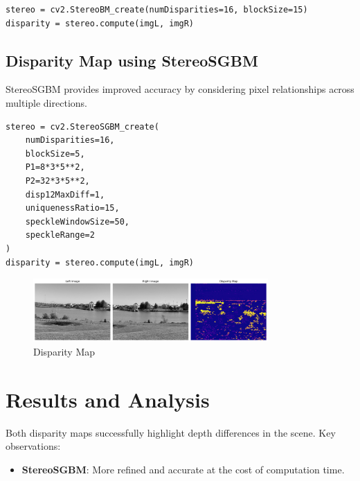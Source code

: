 \documentclass[12pt]{article}
\begin{document}
\begin{verbatim}
stereo = cv2.StereoBM_create(numDisparities=16, blockSize=15)
disparity = stereo.compute(imgL, imgR)
\end{verbatim}


\subsection{Disparity Map using StereoSGBM}
StereoSGBM provides improved accuracy by considering pixel relationships across multiple directions.

\begin{verbatim}
stereo = cv2.StereoSGBM_create(
    numDisparities=16,
    blockSize=5,
    P1=8*3*5**2,
    P2=32*3*5**2,
    disp12MaxDiff=1,
    uniquenessRatio=15,
    speckleWindowSize=50,
    speckleRange=2
)
disparity = stereo.compute(imgL, imgR)
\end{verbatim}

\begin{figure}[H]
    \centering
    \includegraphics[width=0.8\textwidth]{disparity_result2.png}
    \caption{Disparity Map}
\end{figure}

\section{Results and Analysis}
Both disparity maps successfully highlight depth differences in the scene. Key observations:
\begin{itemize}

    \item \textbf{StereoSGBM}: More refined and accurate at the cost of computation time.
\end{itemize}
\end{document}
